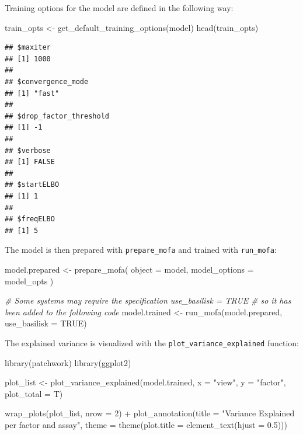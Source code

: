 \documentclass[
]{book}
\newenvironment{Shaded}{\begin{snugshade}}{\end{snugshade}}
\newcommand{\AttributeTok}[1]{\textcolor[rgb]{0.77,0.63,0.00}{#1}}
\newcommand{\CommentTok}[1]{\textcolor[rgb]{0.56,0.35,0.01}{\textit{#1}}}
\newcommand{\ConstantTok}[1]{\textcolor[rgb]{0.00,0.00,0.00}{#1}}
\newcommand{\DecValTok}[1]{\textcolor[rgb]{0.00,0.00,0.81}{#1}}
\newcommand{\FloatTok}[1]{\textcolor[rgb]{0.00,0.00,0.81}{#1}}
\newcommand{\FunctionTok}[1]{\textcolor[rgb]{0.00,0.00,0.00}{#1}}
\newcommand{\NormalTok}[1]{#1}
\newcommand{\OtherTok}[1]{\textcolor[rgb]{0.56,0.35,0.01}{#1}}
\newcommand{\SpecialCharTok}[1]{\textcolor[rgb]{0.00,0.00,0.00}{#1}}
\newcommand{\StringTok}[1]{\textcolor[rgb]{0.31,0.60,0.02}{#1}}
\begin{document}
Training options for the model are defined in the following way:

\begin{Shaded}
\begin{Highlighting}[]
\NormalTok{train\_opts }\OtherTok{\textless{}{-}} \FunctionTok{get\_default\_training\_options}\NormalTok{(model)}
\FunctionTok{head}\NormalTok{(train\_opts)}
\end{Highlighting}
\end{Shaded}

\begin{verbatim}
## $maxiter
## [1] 1000
## 
## $convergence_mode
## [1] "fast"
## 
## $drop_factor_threshold
## [1] -1
## 
## $verbose
## [1] FALSE
## 
## $startELBO
## [1] 1
## 
## $freqELBO
## [1] 5
\end{verbatim}

The model is then prepared with \texttt{prepare\_mofa} and trained with \texttt{run\_mofa}:

\begin{Shaded}
\begin{Highlighting}[]
\NormalTok{model.prepared }\OtherTok{\textless{}{-}} \FunctionTok{prepare\_mofa}\NormalTok{(}
  \AttributeTok{object =}\NormalTok{ model,}
  \AttributeTok{model\_options =}\NormalTok{ model\_opts}
\NormalTok{)}

\CommentTok{\# Some systems may require the specification \textasciigrave{}use\_basilisk = TRUE\textasciigrave{}}
\CommentTok{\# so it has been added to the following code}
\NormalTok{model.trained }\OtherTok{\textless{}{-}} \FunctionTok{run\_mofa}\NormalTok{(model.prepared, }\AttributeTok{use\_basilisk =} \ConstantTok{TRUE}\NormalTok{)}
\end{Highlighting}
\end{Shaded}

The explained variance is visualized with the \texttt{plot\_variance\_explained} function:

\begin{Shaded}
\begin{Highlighting}[]
\FunctionTok{library}\NormalTok{(patchwork)}
\FunctionTok{library}\NormalTok{(ggplot2)}

\NormalTok{plot\_list }\OtherTok{\textless{}{-}} \FunctionTok{plot\_variance\_explained}\NormalTok{(model.trained,}
                                     \AttributeTok{x =} \StringTok{"view"}\NormalTok{, }\AttributeTok{y =} \StringTok{"factor"}\NormalTok{,}
                                     \AttributeTok{plot\_total =}\NormalTok{ T)}

\FunctionTok{wrap\_plots}\NormalTok{(plot\_list, }\AttributeTok{nrow =} \DecValTok{2}\NormalTok{) }\SpecialCharTok{+}
  \FunctionTok{plot\_annotation}\NormalTok{(}\AttributeTok{title =} \StringTok{"Variance Explained per factor and assay"}\NormalTok{,}
                  \AttributeTok{theme =} \FunctionTok{theme}\NormalTok{(}\AttributeTok{plot.title =} \FunctionTok{element\_text}\NormalTok{(}\AttributeTok{hjust =} \FloatTok{0.5}\NormalTok{)))}
\end{Highlighting}
\end{Shaded}
\end{document}
